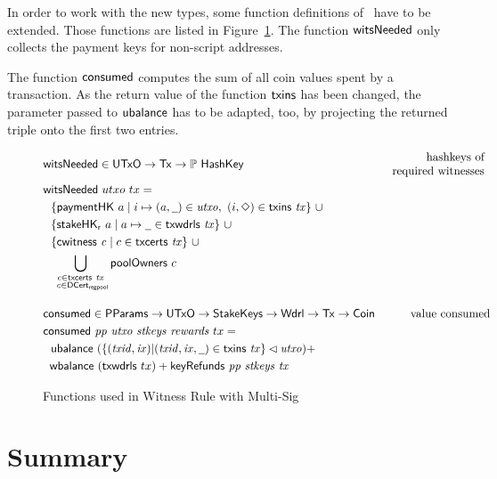 \documentclass[11pt,a4paper,dvipsnames]{article}
\newcommand{\Nothing}{\ensuremath{\Diamond}}
\newcommand{\Tx}{\type{Tx}}
\newcommand{\UTxO}{\type{UTxO}}
\newcommand{\Wdrl}{\type{Wdrl}}
\newcommand{\Coin}{\type{Coin}}
\newcommand{\PParams}{\type{PParams}}
\newcommand{\StakeKeys}{\type{StakeKeys}}
\newcommand{\DCertRegPool}{\type{DCert_{regpool}}}
\newcommand{\HashKey}{\type{HashKey}}
\newcommand{\txins}[1]{\fun{txins}~ \var{#1}}
\newcommand{\txcerts}[1]{\fun{txcerts}~ \var{#1}}
\newcommand{\ubalance}[1]{\fun{ubalance}~ \var{#1}}
\newcommand{\keyRefunds}[3]{\fun{keyRefunds}~ \var{#1}~ \var{#2}~ \var{#3}}
\newcommand{\consumed}[4]{\fun{consumed}~ \var{#1}~ \var{#2}~ \var{#3}~ \var{#4}}
\newcommand{\cwitness}[1]{\fun{cwitness}~ \var{#1}}
\newcommand{\txwdrls}[1]{\fun{txwdrls}~ \var{#1}}
\newcommand{\wcard}[0]{\underline{\phantom{a}}}
\theoremstyle{definition}
\begin{document}
In order to work with the new types, some function definitions
of~\cite{shelley_formal_spec} have to be extended. Those functions are listed in
Figure~\ref{fig:functions-witnesses-multi-sig}. The function $\mathsf{witsNeeded}$
only collects the payment keys for non-script addresses.

The function $\mathsf{consumed}$ computes the sum of all coin values spent by a
transaction. As the return value of the function $\mathsf{txins}$ has been changed,
the parameter passed to $\mathsf{ubalance}$ has to be adapted, too, by projecting
the returned triple onto the first two entries.

\begin{figure}[htb]
  \begin{align*}
    & \fun{witsNeeded} \in \UTxO \to \Tx \to \powerset{\HashKey}
    & \begin{array}{r}
        \text{hashkeys of} \\
        \text{required witnesses}
      \end{array} \\
    & \fun{witsNeeded}~{utxo}~{tx} = \\
    & ~~\{ \fun{paymentHK}~a \mid i \mapsto (a, \wcard) \in
      \var{utxo},~(i,\Nothing)\in\txins{tx}\}~\cup \\
    & ~~\{\fun{stakeHK_r}~a \mid a\mapsto \wcard \in \txwdrls{tx}\}~\cup \\
    & ~~\{\cwitness{c} \mid c \in \txcerts{tx}\}~\cup \\
    & ~~\bigcup_{\substack{c \in \txcerts{tx} \\ ~c \in\DCertRegPool}}
    \fun{poolOwners}~{c}
    \nextdef
    & \fun{consumed} \in \PParams \to \UTxO \to \StakeKeys \to \Wdrl \to \Tx \to \Coin
    & \text{value consumed} \\
    & \consumed{pp}{utxo}{stkeys}{rewards}~{tx} = \\
    & ~~\ubalance{(\{(\var{txid},\var{ix}) \vert (\var{txid}, \var{ix},
      \wcard)\in\txins{tx}\}
      \restrictdom \var{utxo})} + \\
    & \;\;\fun{wbalance}~(\fun{txwdrls}~{tx}) + \keyRefunds{pp}{stkeys}{tx}
  \end{align*}
  \caption{Functions used in Witness Rule with Multi-Sig}
  \label{fig:functions-witnesses-multi-sig}
\end{figure}

\section{Summary}
\label{sec:summary}
\end{document}
